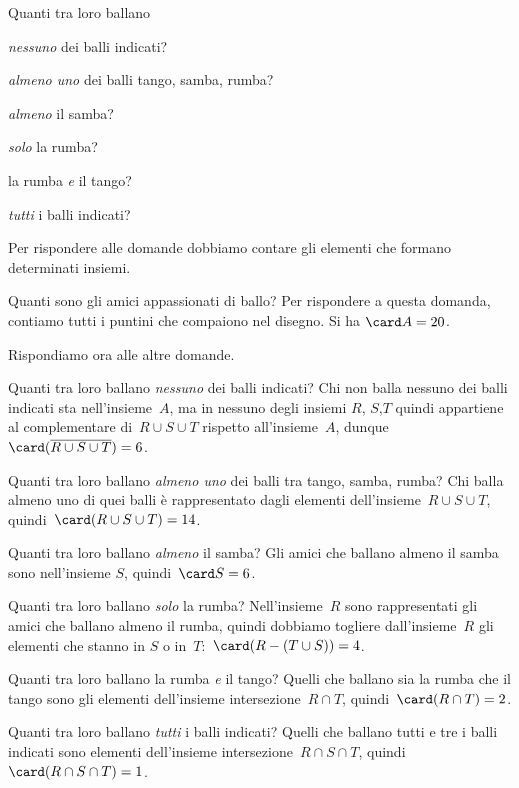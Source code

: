 {\begin{esempio}
\begin{minipage}{.59 \textwidth}
Quanti tra loro ballano
\begin{enumeratea}
\item \emph{nessuno} dei balli indicati?
\item \emph{almeno uno} dei balli tango, samba, rumba?
\item \emph{almeno} il samba?
\item \emph{solo} la rumba?
\item la rumba \emph{e} il tango?
\item \emph{tutti} i balli indicati?
\end{enumeratea}
\end{minipage}
\hfill
\begin{minipage}{.39 \textwidth}
\begin{center}
 
\end{center}
\end{minipage}

Per rispondere alle domande dobbiamo contare gli elementi che formano 
determinati insiemi.

Quanti sono gli amici appassionati di ballo? Per rispondere a questa
domanda, contiamo tutti i puntini che compaiono nel disegno. Si ha 
$\card A=20$.

Rispondiamo ora alle altre domande.
\begin{enumeratea}
 \item Quanti tra loro ballano \emph{nessuno} dei balli indicati?
Chi non balla nessuno dei balli indicati sta nell'insieme~$A$, ma in nessuno 
degli insiemi $R$, $S$,$T$ quindi appartiene al complementare
di~$R\cup S\cup T$ rispetto all'insieme~$A$,
dunque~$\card (\overline{{R\cup S\cup T}})=6$.
 \item Quanti tra loro ballano \emph{almeno uno} dei balli tra tango, 
samba, rumba? Chi balla almeno uno di quei balli è rappresentato dagli elementi
dell'insieme~$R\cup S\cup T$, quindi~$\card(R\cup S\cup T)=14$.
 \item Quanti tra loro ballano \emph{almeno} il samba?
Gli amici che ballano almeno il samba sono nell'insieme
$S$, quindi~$\card S=6$.
 \item Quanti tra loro ballano \emph{solo} la rumba? Nell'insieme~$R$ 
sono rappresentati gli amici che ballano almeno il rumba, quindi dobbiamo 
togliere dall'insieme~$R$ gli elementi che stanno 
in $S$ o in~$T$:~$\card(R-(T\cup S))=4$.
 \item Quanti tra loro ballano la rumba \emph{e} il tango? 
Quelli che ballano sia la rumba che il tango sono gli elementi
dell'insieme intersezione~$R\cap T$, quindi~$\card(R\cap T)=2$.
 \item Quanti tra loro ballano \emph{tutti} i balli indicati? 
Quelli che ballano tutti e tre i balli indicati sono elementi
dell'insieme intersezione~$R\cap S\cap T$, quindi~$\card(R\cap S\cap T)=1$.
\end{enumeratea}


\end{esempio}}
